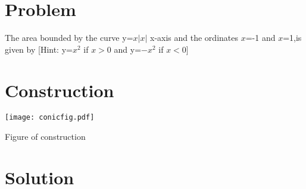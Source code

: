 \documentclass[10pt, a4paper]{article}
\title{\mytitle}
\author{\myauthor\hspace{1em}\\\contact\\FWC22066\hspace{6.5em}IITH\hspace{0.5em}\mymodule\hspace{6em}Assignment}
\begin{document}
	\maketitle
	\tableofcontents
   \section{Problem}
   The area bounded by the curve y=$x|x|$ x-axis and the ordinates $x$=-1 and $x$=1,is given by
[Hint: y=$x^2$ if $x>0$  and y=$-x^2$ if $x<0$]
   					
\section{Construction}
  \texttt{[image: conicfig.pdf]}
  	\begin{center}
  Figure of construction
  	\end{center}
  \section{Solution}
  
\end{document}

